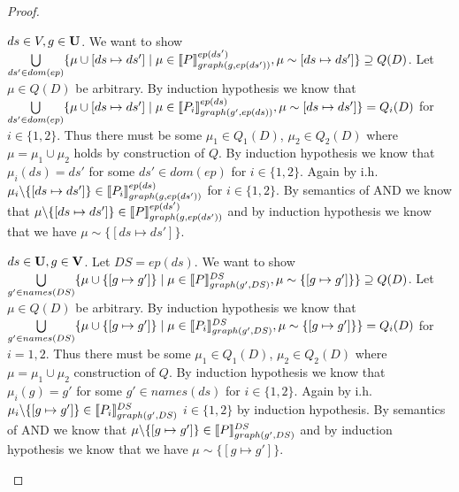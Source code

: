 \begin{proof}
\begin{enumerate}
			\bigskip\noindent
			$ds \in V, g \in \mathbf{U}$.
			We want to show \\
			$\bigcup\limits_{ds' \in dom(ep)} \{ \mu \cup
				[ds \mapsto ds'] \mid \mu \in \llbracket P\rrbracket^{ep(ds')}_{graph(g,ep(ds'))}, \mu \sim
			[ds\mapsto ds'] \}  \supseteq Q(D)$.
			Let $\mu \in Q(D)$ be arbitrary.
			By induction hypothesis we know that  
			$\bigcup\limits_{ds' \in dom(ep)} \{ \mu \cup [ds \mapsto ds'] \mid \mu \in
				\llbracket P_i\rrbracket^{ep(ds)}_{graph(g',ep(ds))}, \mu \sim
			[ds\mapsto ds'] \}  = Q_i(D) $ for $i\in \{1,2\}$.
			Thus there must be some $\mu_1 \in Q_1(D)$, $\mu_2 \in Q_2(D)$ 
			where $\mu= \mu_1 \cup \mu_2$ holds by construction of $Q$.
			By induction hypothesis we know that $\mu_i(ds) = ds'$ for some $ds'
			\in dom(ep)$ for $i \in \{1,2\}$.
			Again by i.h. $\mu_i\backslash\{[ds\mapsto ds'] \} \in \llbracket P_i
			\rrbracket^{ep(ds)}_{graph(g,ep(ds'))}$ for $i \in \{1,2\}$.
			By semantics of AND we know that $\mu \backslash \{[ds\mapsto ds'] \} \in \llbracket P
			\rrbracket^{ep(ds')}_{graph(g,ep(ds'))}$ and by induction hypothesis we know that we have 
			$\mu \sim \{[ds\mapsto ds'] \}$.

			\bigskip\noindent
			$ds \in \mathbf{U}, g \in \mathbf{V}$. Let $DS = ep(ds)$.
			We want to show 
			$\bigcup\limits_{g' \in names(DS)} \{ \mu \cup \{[g
				\mapsto g']\} \mid \mu \in
				\llbracket P\rrbracket^{DS}_{graph(g',DS)}, \mu \sim
			\{[g \mapsto g']\} \}  \supseteq Q(D) $.
			Let $\mu \in Q(D)$ be arbitrary.
			By induction hypothesis we know that  
			$\bigcup\limits_{g' \in names(DS)} \{ \mu \cup \{[g
				\mapsto g']\} \mid \mu \in
				\llbracket P_i\rrbracket^{DS}_{graph(g',DS)}, \mu \sim
			\{[g \mapsto g']\} \}  = Q_i(D) $ for $i=1,2$.
			Thus there must be some $\mu_1 \in Q_1(D)$, $\mu_2 \in Q_2(D)$ 
			where $\mu= \mu_1 \cup \mu_2$ construction of $Q$.
			By induction hypothesis we know that $\mu_i(g) = g'$ for some $g'
			\in names(ds)$ for $i \in \{1,2\}$.
			Again by i.h. $\mu_i\backslash\{ [g \mapsto g'] \} \in \llbracket P_i \rrbracket^{DS}_{graph(g',DS)}$
			$i \in \{1,2\}$ by induction hypothesis. 
			By semantics of AND  we know that $\mu \backslash \{[g \mapsto g'] \} \in \llbracket P
			\rrbracket^{DS}_{graph(g',DS)}$ and by induction hypothesis we know that we have 
			$\mu \sim \{[g \mapsto g'] \}$.


\end{enumerate}
\end{proof}
